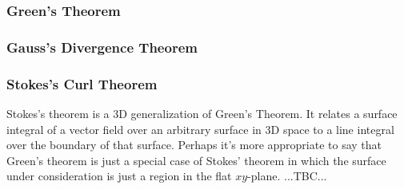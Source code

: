 \subsubsection{Green's Theorem}

\subsubsection{Gauss's Divergence Theorem}

\subsubsection{Stokes's Curl Theorem}
Stokes's theorem is a 3D generalization of Green's Theorem. It relates a surface integral of a vector field over an arbitrary surface in 3D space to a line integral over the boundary of that surface. Perhaps it's more appropriate to say that Green's theorem is just a special case of Stokes' theorem in which the surface under consideration is just a region in the flat $xy$-plane. ...TBC...






\begin{comment}

-make a section for how to compute potentials for a given evctor field
-before that, have a section for how to test, if a potential even exists 

-i'm not sure, if path integrals and surface integrals should be treated here or in the "General Concepts" section ...maybe here - there, we only do integrals of scalar fields


https://en.wikipedia.org/wiki/Matrix_calculus


\end{comment}

